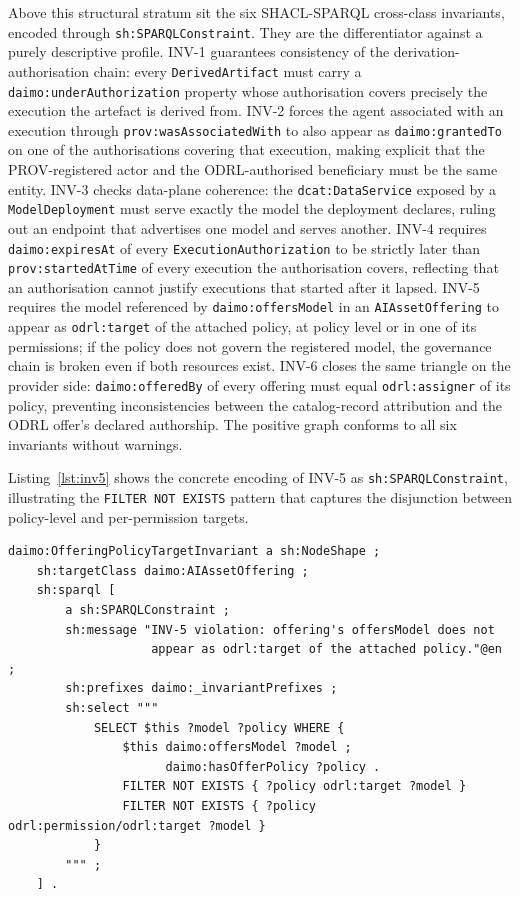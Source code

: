 \documentclass[Afour,sagev,times]{sagej}
\newcommand{\code}[1]{\texttt{#1}}
\begin{document}
Above this structural stratum sit the six SHACL-SPARQL cross-class invariants, encoded through \code{sh:SPARQLConstraint}. They are the differentiator against a purely descriptive profile. INV-1 guarantees consistency of the derivation-authorisation chain: every \code{DerivedArtifact} must carry a \code{daimo:underAuthorization} property whose authorisation covers precisely the execution the artefact is derived from. INV-2 forces the agent associated with an execution through \code{prov:wasAssociatedWith} to also appear as \code{daimo:grantedTo} on one of the authorisations covering that execution, making explicit that the PROV-registered actor and the ODRL-authorised beneficiary must be the same entity. INV-3 checks data-plane coherence: the \code{dcat:DataService} exposed by a \code{ModelDeployment} must serve exactly the model the deployment declares, ruling out an endpoint that advertises one model and serves another. INV-4 requires \code{daimo:expiresAt} of every \code{ExecutionAuthorization} to be strictly later than \code{prov:startedAtTime} of every execution the authorisation covers, reflecting that an authorisation cannot justify executions that started after it lapsed. INV-5 requires the model referenced by \code{daimo:offersModel} in an \code{AIAssetOffering} to appear as \code{odrl:target} of the attached policy, at policy level or in one of its permissions; if the policy does not govern the registered model, the governance chain is broken even if both resources exist. INV-6 closes the same triangle on the provider side: \code{daimo:offeredBy} of every offering must equal \code{odrl:assigner} of its policy, preventing inconsistencies between the catalog-record attribution and the ODRL offer's declared authorship. The positive graph conforms to all six invariants without warnings.

Listing~\ref{lst:inv5} shows the concrete encoding of INV-5 as \code{sh:SPARQLConstraint}, illustrating the \code{FILTER NOT EXISTS} pattern that captures the disjunction between policy-level and per-permission targets.

\begin{lstlisting}[label=lst:inv5,caption={INV-5 encoded as a \code{sh:SPARQLConstraint}.}]
daimo:OfferingPolicyTargetInvariant a sh:NodeShape ;
    sh:targetClass daimo:AIAssetOffering ;
    sh:sparql [
        a sh:SPARQLConstraint ;
        sh:message "INV-5 violation: offering's offersModel does not
                    appear as odrl:target of the attached policy."@en ;
        sh:prefixes daimo:_invariantPrefixes ;
        sh:select """
            SELECT $this ?model ?policy WHERE {
                $this daimo:offersModel ?model ;
                      daimo:hasOfferPolicy ?policy .
                FILTER NOT EXISTS { ?policy odrl:target ?model }
                FILTER NOT EXISTS { ?policy odrl:permission/odrl:target ?model }
            }
        """ ;
    ] .
\end{lstlisting}
\end{document}
